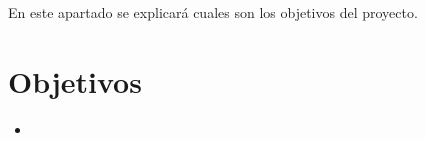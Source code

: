 En este apartado se explicará cuales son los objetivos del proyecto.

\section{Objetivos}
\begin{itemize}
	\item 
\end{itemize}